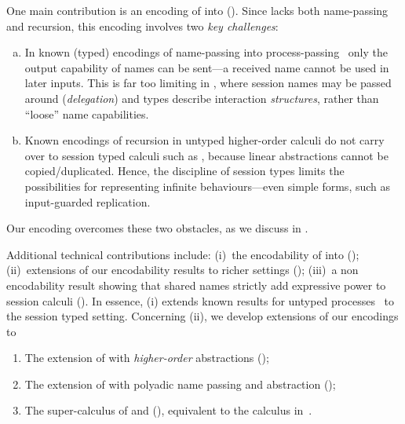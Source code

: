 \documentclass[runningheads]{llncs}
\begin{document}
One main contribution is 
an encoding of \HOp into \HO ().  
Since \HO lacks 
both name-passing and recursion, this encoding involves two \emph{key challenges}:
\begin{enumerate}[a.]
\item In known (typed) 
encodings of name-passing into process-passing~\cite{SaWabook} %
only the output capability of names can be sent---a received name cannot be used in later inputs.
This is far too limiting in \HOp, where 
 session names %
 may be passed around (\emph{delegation})
and types describe interaction  \emph{structures}, rather than ``loose'' name capabilities. %



\item %
Known encodings of recursion in untyped higher-order calculi
do not carry over to session typed calculi such as \HOp,
because linear abstractions cannot be copied/duplicated. Hence, the discipline of session types  limits 
the possibilities for representing infinite behaviours---even simple forms, such as input-guarded replication.
\end{enumerate}





Our encoding overcomes these two obstacles, as we discuss in .

Additional technical contributions include: 
(i)~the encodability of \HO into \sessp (); 
(ii)~extensions of our encodability results to richer settings ();
(iii)~a non encodability result showing that shared names strictly add expressive power to session calculi ().
In essence, (i) extends known  results for untyped processes~\cite{SangiorgiD:expmpa} to the session typed setting.
Concerning (ii), we develop extensions of our encodings to 
\begin{enumerate}[-]
\item The extension of \HOp with \emph{higher-order} abstractions (\HOpp); 
\item The extension of \HOp with polyadic name passing and abstraction (\PHOp); 
\item The super-calculus of \HOpp and \PHOp (\PHOpp), equivalent to the calculus in~\cite{tlca07}.
\end{enumerate}
\end{document}
